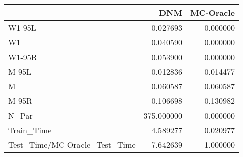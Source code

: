 \begin{tabular}{lrr}
\toprule
{} &         DNM &  MC-Oracle \\
\midrule
W1-95L                        &    0.027693 &   0.000000 \\
W1                            &    0.040590 &   0.000000 \\
W1-95R                        &    0.053900 &   0.000000 \\
M-95L                         &    0.012836 &   0.014477 \\
M                             &    0.060587 &   0.060587 \\
M-95R                         &    0.106698 &   0.130982 \\
N\_Par                         &  375.000000 &   0.000000 \\
Train\_Time                    &    4.589277 &   0.020977 \\
Test\_Time/MC-Oracle\_Test\_Time &    7.642639 &   1.000000 \\
\bottomrule
\end{tabular}
